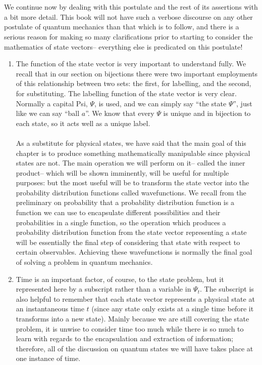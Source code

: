 \\\\
We continue now by dealing with this postulate and the rest of its assertions with a bit more detail. This book will not have such a verbose discourse on any other postulate of quantum mechanics than that which is to follow, and there is a serious reason for making so many clarifications prior to starting to consider the mathematics of state vectors-- everything else is predicated on this postulate!
\begin{enumerate}
    \item The function of the state vector is very important to understand fully. We recall that in our section on bijections there were two important employments of this relationship between two sets: the first, for labelling, and the second, for substituting. The labelling function of the state vector is very clear. Normally a capital Psi, $\Psi$, is used, and we can simply say ``the state $\Psi$'', just like we can say ``ball $a$''. We know that every $\Psi$ is unique and in bijection to each state, so it acts well as a unique label.
    \\\\
    As a substitute for physical states, we have said that the main goal of this chapter is to produce something mathematically manipulable since physical states are not. The main operation we will perform on it-- called the inner product-- which will be shown imminently, will be useful for multiple purposes: but the most useful will be to transform the state vector into the probability distribution functions called wavefunctions. We recall from the preliminary on probability that a probability distribution function is a function we can use to encapsulate different possibilities and their probabilities in a single function, so the operation which produces a probability distribution function from the state vector representing a state will be essentially the final step of considering that state with respect to certain observables. Achieving these wavefunctions is normally the final goal of solving a problem in quantum mechanics.
    \item Time is an important factor, of course, to the state problem, but it represented here by a subscript rather than a variable in $\Psi_{t}$. The subscript is also helpful to remember that each state vector represents a physical state at an instantaneous time $t$ (since any state only exists at a single time before it transforms into a new state). Mainly because we are still covering the state problem, it is unwise to consider time too much while there is so much to learn with regards to the encapsulation and extraction of information; therefore, all of the discussion on quantum states we will have takes place at one instance of time.

\end{enumerate}
